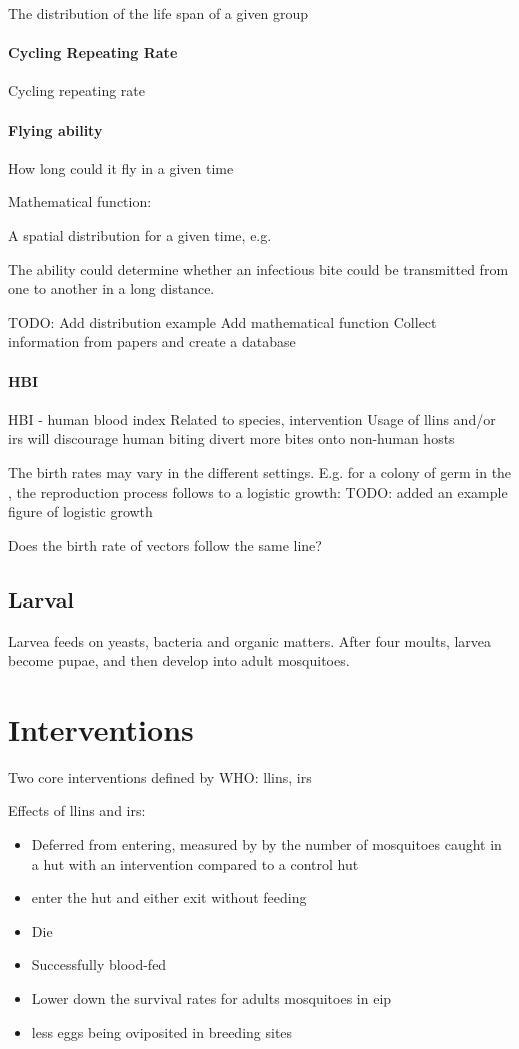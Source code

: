 \documentclass[a4paper, 12pt, twoside]{article}
\begin{document}
The distribution of the life span of a given group

\paragraph{Cycling Repeating Rate}
Cycling repeating rate

\paragraph{Flying ability}
How long could it fly in a given time

Mathematical function:

A spatial distribution for a given time, e.g.

The ability could determine whether an infectious bite could be transmitted from one to another in a long distance.

TODO:
Add distribution example
Add mathematical function
Collect information from papers and create a database
\paragraph{HBI}
HBI - human blood index
	Related to species, intervention
  Usage of \gls{llins} and/or \gls{irs} will discourage human biting divert more bites onto non-human hosts

	The birth rates may vary in the different settings. E.g. for a colony of germ in the , the reproduction process follows to a logistic growth:
TODO: added an example figure of logistic growth
	
	Does the birth rate of vectors follow the same line?

\subsection{Larval}

Larvea feeds on yeasts, bacteria and organic matters. After four moults, larvea become pupae, and then develop into adult mosquitoes.

\section{Interventions}

Two core interventions defined by WHO: \gls{llins}, \gls{irs}

Effects of \gls{llins} and \gls{irs}:

\begin{itemize}
\item Deferred from entering, measured by by the number of mosquitoes caught in a hut with an intervention compared to a control hut
\item enter the hut and either exit without feeding
\item Die
\item Successfully blood-fed
\item Lower down the survival rates for adults mosquitoes in \gls{eip} 
\item less eggs being oviposited in breeding sites
\end{itemize}
\end{document}

